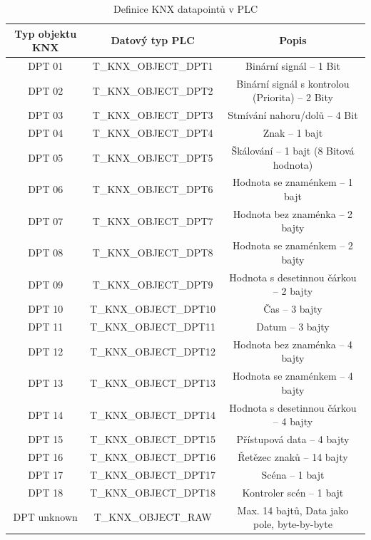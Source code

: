 \begin{table}[h]
    \caption[Definice KNX datapointů v PLC]{Definice KNX datapointů v PLC}
        \small
            \centering
            \begin{tabular}{|c|c|c|}
                \hline
                Typ objektu KNX & Datový typ PLC & Popis  \\
                \hline\hline
                DPT 01 & T\_KNX\_OBJECT\_DPT1 & Binární signál -- 1 Bit \\
                \hline
                DPT 02 & T\_KNX\_OBJECT\_DPT2 & Binární signál s kontrolou (Priorita) -- 2 Bity \\
                \hline
                DPT 03 & T\_KNX\_OBJECT\_DPT3 & Stmívání nahoru/dolů -- 4 Bit \\
                \hline
                DPT 04 & T\_KNX\_OBJECT\_DPT4 & Znak -- 1 bajt \\
                \hline
                DPT 05 & T\_KNX\_OBJECT\_DPT5 & Škálování -- 1 bajt (8 Bitová hodnota) \\
                \hline
                DPT 06 & T\_KNX\_OBJECT\_DPT6 & Hodnota se znaménkem -- 1 bajt \\
                \hline
                DPT 07 & T\_KNX\_OBJECT\_DPT7 & Hodnota bez znaménka -- 2 bajty \\
                \hline
                DPT 08 & T\_KNX\_OBJECT\_DPT8 & Hodnota se znaménkem -- 2 bajty \\
                \hline
                DPT 09 & T\_KNX\_OBJECT\_DPT9 & Hodnota s desetinnou čárkou -- 2 bajty\\
                \hline
                DPT 10 & T\_KNX\_OBJECT\_DPT10 & Čas -- 3 bajty \\
                \hline
                DPT 11 & T\_KNX\_OBJECT\_DPT11 & Datum -- 3 bajty \\
                \hline
                DPT 12 & T\_KNX\_OBJECT\_DPT12 & Hodnota bez znaménka -- 4 bajty \\
                \hline
                DPT 13 & T\_KNX\_OBJECT\_DPT13 & Hodnota se znaménkem -- 4 bajty \\
                \hline
                DPT 14 & T\_KNX\_OBJECT\_DPT14 & Hodnota s desetinnou čárkou -- 4 bajty \\
                \hline
                DPT 15 & T\_KNX\_OBJECT\_DPT15 & Přístupová data -- 4 bajty \\
                \hline
                DPT 16 & T\_KNX\_OBJECT\_DPT16 & Řetězec znaků -- 14 bajty \\
                \hline
                DPT 17 & T\_KNX\_OBJECT\_DPT17 & Scéna -- 1 bajt \\
                \hline
                DPT 18 & T\_KNX\_OBJECT\_DPT18 & Kontroler scén -- 1 bajt \\
                \hline
                DPT unknown & T\_KNX\_OBJECT\_RAW & Max. 14 bajtů, Data jako pole, byte-by-byte \\
                \hline
            \end{tabular}
\end{table}
